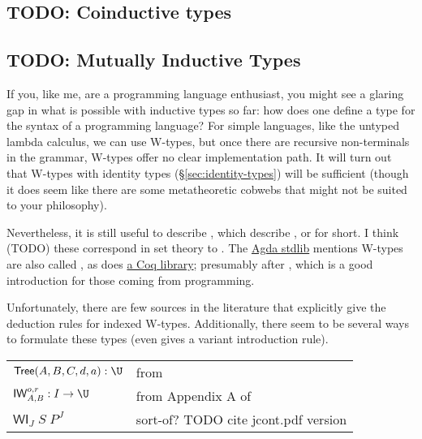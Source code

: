 \documentclass[11pt]{article} %
\theoremstyle{definition}
\theoremstyle{remark}
\begin{document}
\subsection{TODO: Coinductive types}

\subsection{TODO: Mutually Inductive Types}

If you, like me, are a programming language enthusiast, you might see a glaring gap in what is possible with inductive types so far: how does one define a type for the syntax of a programming language?
For simple languages, like the untyped lambda calculus, we can use W-types, but once there are recursive non-terminals in the grammar, W-types offer no clear implementation path.
It will turn out that W-types with identity types (\S\ref{sec:identity-types}) will be sufficient (though it does seem like there are some metatheoretic cobwebs that might not be suited to your philosophy).

Nevertheless, it is still useful to describe , which describe , or  for short.
I think (TODO) these correspond in set theory to .
The \href{https://github.com/agda/agda-stdlib/blob/master/src/Data/W/Indexed.agda}{Agda stdlib} mentions W-types are also called , as does \href{http://www-sop.inria.fr/lemme/Venanzio.Capretta/coq/General_Trees.g.html}{a Coq library}; presumably after \cite{petersson-synek_1989}, which is a good introduction for those coming from programming.

Unfortunately, there are few sources in the literature that explicitly give the deduction rules for indexed W-types.
Additionally, there seem to be several ways to formulate these types (even \cite{petersson-synek_1989} gives a variant introduction rule).
\begin{center}
\renewcommand{\arraystretch}{1.2}
\begin{tabular}{lp{10cm}}
$\mathsf{Tree}(A,B,C,d,a) : \U$ & from \cite{petersson-synek_1989} \\
$\mathop\mathsf{IW}_{A,B}^{o,r} : I \to \U$ & from Appendix A of \cite{kaposi_2020} \\
$\mathsf{WI}_J\;S\;P^J$ & sort-of? TODO cite jcont.pdf version \\
\end{tabular}
\end{center}
\end{document}
